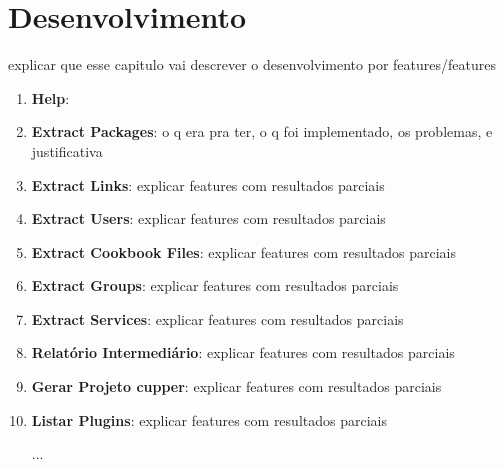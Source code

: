 \newpage\null\thispagestyle{empty}\newpage
\chapter{Desenvolvimento}
\label{chap:dev}

{\color{red} explicar que esse capitulo vai descrever o desenvolvimento por 
features/features}


\begin{enumerate}
  \item \textbf{Help}:
  \item \textbf{Extract Packages}: {\color{red} o q era pra ter, o q foi implementado, os problemas, e justificativa }
  \item \textbf{Extract Links}:{\color{red} explicar features com resultados parciais}
  \item \textbf{Extract Users}:{\color{red} explicar features com resultados parciais}
  \item \textbf{Extract Cookbook Files}:{\color{red} explicar features com resultados parciais}
  \item \textbf{Extract Groups}:{\color{red} explicar features com resultados parciais}
  \item \textbf{Extract Services}:{\color{red} explicar features com resultados parciais}
  \item \textbf{Relatório Intermediário}:{\color{red} explicar features com resultados parciais}
  \item \textbf{Gerar Projeto cupper}:{\color{red} explicar features com resultados parciais}
  \item \textbf{Listar Plugins}:{\color{red} explicar features com resultados parciais}

  {\color{red} ...}

\end{enumerate}

